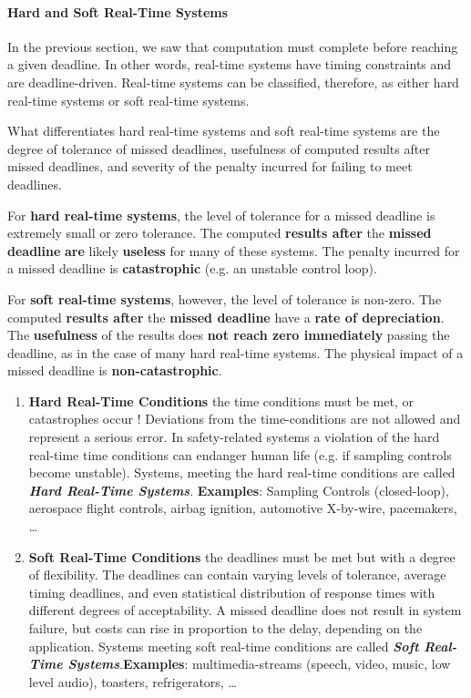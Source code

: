 \paragraph{  Hard and Soft Real-Time Systems}

In the previous section, we saw that computation must complete before reaching a given deadline. In other words, real-time systems have timing constraints and are deadline-driven. Real-time systems can be classified, therefore, as either hard real-time systems or soft real-time systems.

What differentiates hard real-time systems and soft real-time systems are the degree of tolerance of missed deadlines, usefulness of computed results after missed deadlines, and severity of the penalty incurred for failing to meet deadlines.

For \textbf{hard real-time systems}, the level of tolerance for a missed deadline is extremely small or zero tolerance. The computed \textbf{results after} the \textbf{missed} \textbf{deadline} \textbf{are} likely \textbf{useless} for many of these systems. The penalty incurred for a missed deadline is \textbf{catastrophic} (e.g. an unstable control loop). 

For \textbf{soft real-time systems}, however, the level of tolerance is non-zero. The computed \textbf{results after} the \textbf{missed deadline} have a \textbf{rate of depreciation}. The \textbf{usefulness} of the results does \textbf{not reach zero immediately} passing the deadline, as in the case of many hard real-time systems. The physical impact of a missed deadline is\textbf{ non-catastrophic}.

\begin{enumerate}
	\item  \textbf{Hard Real-Time Conditions} the time conditions must be met, or catastrophes occur !  Deviations from the time-conditions are not allowed and represent a serious error. In safety-related systems a violation of the hard real-time time conditions can endanger human life (e.g. if sampling controls become unstable). Systems, meeting the hard real-time conditions are called \textbf{\textit{Hard Real-Time Systems}}. \textbf{Examples}: Sampling Controls (closed-loop), aerospace flight controls, airbag ignition, automotive X-by-wire, pacemakers, {\dots} 
	\item  \textbf{Soft Real-Time Conditions} the deadlines must be met but with a degree of flexibility. The deadlines can contain varying levels of tolerance, average timing deadlines, and even statistical distribution of response times with different degrees of acceptability. A missed deadline does not result in system failure, but costs can rise in proportion to the delay, depending on the application. Systems meeting soft real-time conditions are called \textbf{\textit{Soft Real-Time Systems}}.\textbf{Examples}: multimedia-streams (speech, video, music, low level audio), toasters, refrigerators, {\dots} 
\end{enumerate}

